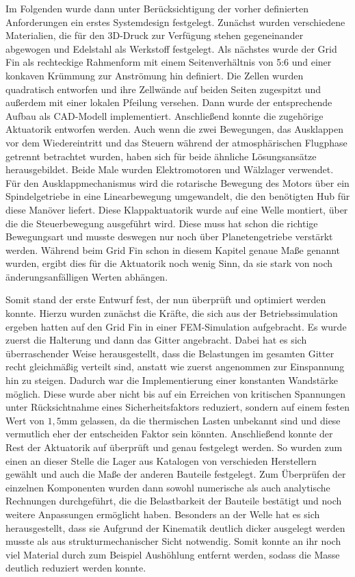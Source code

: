 Im Folgenden wurde dann unter Berücksichtigung der vorher definierten Anforderungen ein erstes Systemdesign festgelegt. Zunächst wurden verschiedene Materialien, die für den 3D-Druck zur Verfügung stehen gegeneinander abgewogen und Edelstahl als Werkstoff festgelegt. Als nächstes wurde der Grid Fin als rechteckige Rahmenform mit einem Seitenverhältnis von 5:6 und einer konkaven Krümmung zur Anströmung hin definiert. Die Zellen wurden quadratisch entworfen und ihre Zellwände auf beiden Seiten zugespitzt und außerdem mit einer lokalen Pfeilung versehen. Dann wurde der entsprechende Aufbau als CAD-Modell implementiert. Anschließend konnte die zugehörige Aktuatorik entworfen werden. Auch wenn die zwei Bewegungen, das Ausklappen vor dem Wiedereintritt und das Steuern während der atmosphärischen Flugphase getrennt betrachtet wurden, haben sich für beide ähnliche Lösungsansätze herausgebildet. Beide Male wurden Elektromotoren und Wälzlager verwendet. Für den Ausklappmechanismus wird die rotarische Bewegung des Motors über ein Spindelgetriebe in eine Linearbewegung  umgewandelt, die den benötigten Hub für diese Manöver liefert. Diese Klappaktuatorik wurde auf eine Welle montiert, über die die Steuerbewegung ausgeführt wird. Diese muss hat schon die richtige Bewegungsart und musste deswegen nur noch über Planetengetriebe verstärkt werden. Während beim Grid Fin schon in diesem Kapitel genaue Maße genannt wurden, ergibt dies für die Aktuatorik noch wenig Sinn, da sie stark von noch änderungsanfälligen Werten abhängen.

Somit stand der erste Entwurf fest, der nun überprüft und optimiert werden konnte. Hierzu wurden zunächst die Kräfte, die sich aus der Betriebssimulation ergeben hatten auf den Grid Fin in einer FEM-Simulation aufgebracht. Es wurde zuerst die Halterung und dann das Gitter angebracht. Dabei hat es sich überraschender Weise herausgestellt, dass die Belastungen im gesamten Gitter recht gleichmäßig verteilt sind, anstatt wie zuerst angenommen zur Einspannung hin zu steigen. Dadurch war die Implementierung einer konstanten Wandstärke möglich. Diese wurde aber nicht bis auf ein Erreichen von kritischen Spannungen unter Rücksichtnahme eines Sicherheitsfaktors reduziert, sondern auf einem festen Wert von $1,5$mm gelassen, da die thermischen Lasten unbekannt sind und diese vermutlich eher der entscheiden Faktor sein könnten. Anschließend konnte der Rest der Aktuatorik auf überprüft und genau festgelegt werden. So wurden zum einen an dieser Stelle die Lager aus Katalogen von verschieden Herstellern gewählt und auch die Maße der anderen Bauteile festgelegt. Zum Überprüfen der einzelnen Komponenten wurden dann sowohl numerische als auch analytische Rechnungen durchgeführt, die die Belastbarkeit der Bauteile bestätigt und noch weitere Anpassungen ermöglicht haben. Besonders an der Welle hat es sich herausgestellt, dass sie Aufgrund der Kinematik deutlich dicker ausgelegt werden musste als aus strukturmechanischer Sicht notwendig. Somit konnte an ihr noch viel Material durch zum Beispiel Aushöhlung entfernt werden, sodass  die Masse deutlich reduziert werden konnte.

